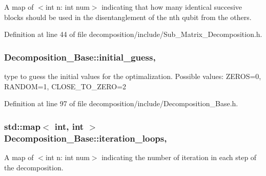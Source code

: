 A map of $<$int n\+: int num$>$ indicating that how many identical succesive blocks should be used in the disentanglement of the nth qubit from the others. 



Definition at line 44 of file decomposition/include/\+Sub\+\_\+\+Matrix\+\_\+\+Decomposition.\+h.

\subsubsection[{\texorpdfstring{initial\+\_\+guess}{initial_guess}}]{ Decomposition\+\_\+\+Base\+::initial\+\_\+guess\hspace{0.3cm}{\ttfamily [protected]}, {\ttfamily [inherited]}}\hypertarget{class_decomposition___base_ad8df090247ebaea3ebb69e7737b194b9}{}\label{class_decomposition___base_ad8df090247ebaea3ebb69e7737b194b9}


type to guess the initial values for the optimalization. Possible values\+: Z\+E\+R\+OS=0, R\+A\+N\+D\+OM=1, C\+L\+O\+S\+E\+\_\+\+T\+O\+\_\+\+Z\+E\+RO=2 



Definition at line 97 of file decomposition/include/\+Decomposition\+\_\+\+Base.\+h.

\subsubsection[{\texorpdfstring{iteration\+\_\+loops}{iteration_loops}}]{\setlength{\rightskip}{0pt plus 5cm}std\+::map$<$ int, int $>$ Decomposition\+\_\+\+Base\+::iteration\+\_\+loops\hspace{0.3cm}{\ttfamily [protected]}, {\ttfamily [inherited]}}\hypertarget{class_decomposition___base_aa6f08845d47e18b6e6739b46d8fe35eb}{}\label{class_decomposition___base_aa6f08845d47e18b6e6739b46d8fe35eb}


A map of $<$int n\+: int num$>$ indicating the number of iteration in each step of the decomposition. 



